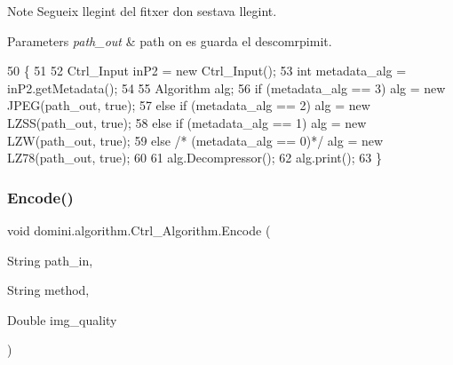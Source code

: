 \begin{DoxyNote}{Note}
Segueix llegint del fitxer d\textquotesingle{}on s\textquotesingle{}estava llegint. 
\end{DoxyNote}

\begin{DoxyParams}{Parameters}
{\em path\+\_\+out} & path on es guarda el descomrpimit. \\
\hline
\end{DoxyParams}

\begin{DoxyCode}
50                                         \{
51 
52         Ctrl\_Input inP2 = \textcolor{keyword}{new} Ctrl\_Input();
53         \textcolor{keywordtype}{int} metadata\_alg = inP2.getMetadata();
54 
55         Algorithm alg;
56         \textcolor{keywordflow}{if}      (metadata\_alg == 3)   alg = \textcolor{keyword}{new} JPEG(path\_out, \textcolor{keyword}{true});
57         \textcolor{keywordflow}{else} \textcolor{keywordflow}{if} (metadata\_alg == 2)   alg = \textcolor{keyword}{new} LZSS(path\_out, \textcolor{keyword}{true});
58         \textcolor{keywordflow}{else} \textcolor{keywordflow}{if} (metadata\_alg == 1)   alg = \textcolor{keyword}{new} LZW(path\_out, \textcolor{keyword}{true});
59         \textcolor{keywordflow}{else} \textcolor{comment}{/* (metadata\_alg == 0)*/} alg = \textcolor{keyword}{new} LZ78(path\_out, \textcolor{keyword}{true});
60         
61         alg.Decompressor();      
62         alg.print();
63     \}
\end{DoxyCode}
\mbox{\label{classdomini_1_1algorithm_1_1Ctrl__Algorithm_ac03e09b1fd22f0857bf766fc692efc33}} 
\subsubsection{\texorpdfstring{Encode()}{Encode()}}
{\footnotesize\ttfamily void domini.\+algorithm.\+Ctrl\+\_\+\+Algorithm.\+Encode (\begin{DoxyParamCaption}\item[{String}]{path\+\_\+in,  }\item[{String}]{method,  }\item[{Double}]{img\+\_\+quality }\end{DoxyParamCaption})\hspace{0.3cm}{\ttfamily [inline]}}



